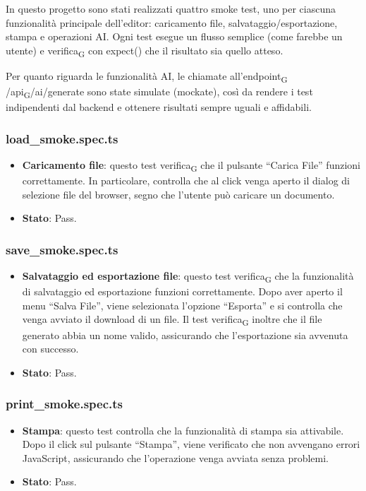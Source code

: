 \documentclass[11pt,a4paper]{article}
\newcommand{\gls}[1]{#1\textsubscript{G}}
\begin{document}
In questo progetto sono stati realizzati quattro smoke test, uno per ciascuna funzionalità principale dell’editor: caricamento file, salvataggio/esportazione, stampa e operazioni AI. Ogni test esegue un flusso semplice (come farebbe un utente) e \gls{verifica} con expect() che il risultato sia quello atteso.

Per quanto riguarda le funzionalità AI, le chiamate all’\gls{endpoint} /\gls{api}/ai/generate sono state simulate (mockate), così da rendere i test indipendenti dal backend e ottenere risultati sempre uguali e affidabili.

\subsubsection{load\_smoke.spec.ts}
\begin{itemize}
\item \textbf{Caricamento file}: questo test \gls{verifica} che il pulsante “Carica File” funzioni correttamente. In particolare, controlla che al click venga aperto il dialog di selezione file del browser, segno che l’utente può caricare un documento.
\item \textbf{Stato}: Pass.
\end{itemize}

\subsubsection{save\_smoke.spec.ts}
\begin{itemize}
\item \textbf{Salvataggio ed esportazione file}: questo test \gls{verifica} che la funzionalità di salvataggio ed esportazione funzioni correttamente. Dopo aver aperto il menu “Salva File”, viene selezionata l’opzione “Esporta” e si controlla che venga avviato il download di un file. Il test \gls{verifica} inoltre che il file generato abbia un nome valido, assicurando che l’esportazione sia avvenuta con successo.
\item \textbf{Stato}: Pass.
\end{itemize}

\subsubsection{print\_smoke.spec.ts}
\begin{itemize}
\item \textbf{Stampa}: questo test controlla che la funzionalità di stampa sia attivabile. Dopo il click sul pulsante “Stampa”, viene verificato che non avvengano errori JavaScript, assicurando che l’operazione venga avviata senza problemi.
\item \textbf{Stato}: Pass.
\end{itemize}
\end{document}
